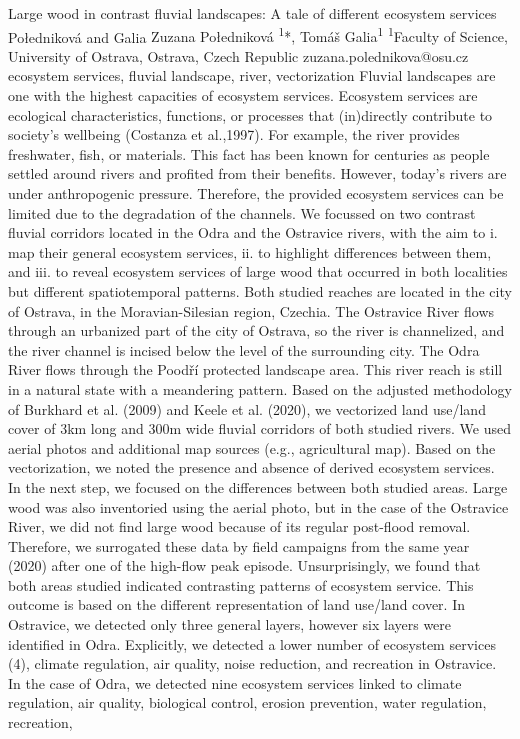 \abstract
{Large wood in contrast fluvial landscapes: A tale of different ecosystem services} 
{Połedniková and Galia} 
{Zuzana Połedniková \textsuperscript{1}*, Tomáš Galia\textsuperscript{1}} 
{\TLtag} 
{
\textsuperscript{1}Faculty of Science, University of Ostrava, Ostrava, Czech Republic
}
{zuzana.polednikova@osu.cz}  %
{ecosystem services, fluvial landscape, river, vectorization}
{
Fluvial landscapes are one with the highest capacities of ecosystem services. Ecosystem services are ecological characteristics, functions, or processes that (in)directly contribute to society's wellbeing (Costanza et al.,1997). For example, the river provides freshwater, fish, or materials. This fact has been known for centuries as people settled around rivers and profited from their benefits. However, today’s rivers are under anthropogenic pressure. Therefore, the provided ecosystem services can be limited due to the degradation of the channels. We focussed on two contrast fluvial corridors located in the Odra and the Ostravice rivers, with the aim to i. map their general ecosystem services, ii. to highlight differences between them, and iii. to reveal ecosystem services of large wood that occurred in both localities but different spatiotemporal patterns. Both studied reaches are located in the city of Ostrava, in the Moravian-Silesian region, Czechia. The Ostravice River flows through an urbanized part of the city of Ostrava, so the river is channelized, and the river channel is incised below the level of the surrounding city. The Odra River flows through the Poodří protected landscape area. This river reach is still in a natural state with a meandering pattern. Based on the adjusted methodology of Burkhard et al. (2009) and Keele et al. (2020), we vectorized land use/land cover of 3km long and 300m wide fluvial corridors of both studied rivers.  We used aerial photos and additional map sources (e.g., agricultural map). Based on the vectorization, we noted the presence and absence of derived ecosystem services. In the next step, we focused on the differences between both studied areas. Large wood was also inventoried using the aerial photo, but in the case of the Ostravice River, we did not find large wood because of its regular post-flood removal. Therefore, we surrogated these data by field campaigns from the same year (2020) after one of the high-flow peak episode. Unsurprisingly, we found that both areas studied indicated contrasting patterns of ecosystem service. This outcome is based on the different representation of land use/land cover. In Ostravice, we detected only three general layers, however six layers were identified in Odra. Explicitly, we detected a lower number of ecosystem services (4), climate regulation, air quality, noise reduction, and recreation in Ostravice. In the case of Odra, we detected nine ecosystem services linked to climate regulation, air quality, biological control, erosion prevention, water regulation, recreation, }
